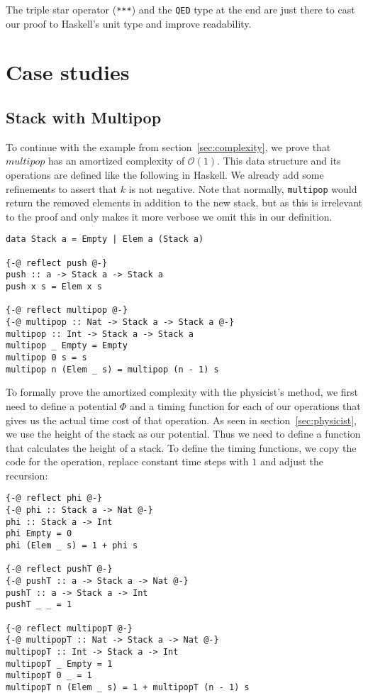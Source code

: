 \documentclass[sigplan,screen,review,anonymous]{acmart}
\renewcommand\O[1]{$\mathcal{O}(#1)$}
\begin{document}
The triple star operator (\texttt{***}) and the \texttt{QED} type at the end are just there to cast our proof to Haskell's unit type and improve readability.

\section{Case studies}

\subsection{Stack with Multipop}\label{sec:stack}

To continue with the example from section~\ref{sec:complexity}, we prove that $multipop$ has an amortized complexity of \O{1}. This data structure and its operations are defined like the following in Haskell. We already add some refinements to assert that $k$ is not negative. Note that normally, \texttt{multipop} would return the removed elements in addition to the new stack, but as this is irrelevant to the proof and only makes it more verbose we omit this in our definition.

\begin{lstlisting}
data Stack a = Empty | Elem a (Stack a)

{-@ reflect push @-}
push :: a -> Stack a -> Stack a
push x s = Elem x s

{-@ reflect multipop @-}
{-@ multipop :: Nat -> Stack a -> Stack a @-}
multipop :: Int -> Stack a -> Stack a
multipop _ Empty = Empty
multipop 0 s = s
multipop n (Elem _ s) = multipop (n - 1) s
\end{lstlisting}

To formally prove the amortized complexity with the physicist's method, we first need to define a potential $\Phi$ and a timing function for each of our operations that gives us the actual time cost of that operation. As seen in section~\ref{sec:physicist}, we use the height of the stack as our potential. Thus we need to define a function that calculates the height of a stack. To define the timing functions, we copy the code for the operation, replace constant time steps with $1$ and adjust the recursion:

\begin{lstlisting}
{-@ reflect phi @-}
{-@ phi :: Stack a -> Nat @-}
phi :: Stack a -> Int
phi Empty = 0
phi (Elem _ s) = 1 + phi s

{-@ reflect pushT @-}
{-@ pushT :: a -> Stack a -> Nat @-}
pushT :: a -> Stack a -> Int
pushT _ _ = 1

{-@ reflect multipopT @-}
{-@ multipopT :: Nat -> Stack a -> Nat @-}
multipopT :: Int -> Stack a -> Int
multipopT _ Empty = 1
multipopT 0 _ = 1
multipopT n (Elem _ s) = 1 + multipopT (n - 1) s
\end{lstlisting}
\end{document}
